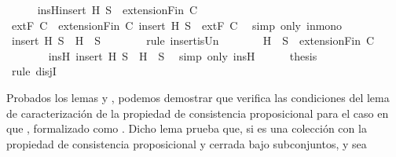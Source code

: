 \begin{isabellebody}
\ \ \ \ \isamarkupfalse%
\ insH{\isacharcolon}{\isachardoublequoteopen}insert\ H\ S\ {\isasymin}\ {\isacharparenleft}extensionFin\ C{\isacharparenright}{\isachardoublequoteclose}\isanewline
\ \ \ \ \ \ \isamarkupfalse%
\ {\isacartoucheopen}{\isacharparenleft}extF\ C{\isacharparenright}\ {\isasymsubseteq}\ {\isacharparenleft}extensionFin\ C{\isacharparenright}{\isacartoucheclose}\ {\isacartoucheopen}insert\ H\ S\ {\isasymin}\ {\isacharparenleft}extF\ C{\isacharparenright}{\isacartoucheclose}\ \isamarkupfalse%
\ {\isacharparenleft}simp\ only{\isacharcolon}\ in{\isacharunderscore}mono{\isacharparenright}\isanewline
\ \ \ \ \isamarkupfalse%
\ {\isachardoublequoteopen}insert\ H\ S\ {\isacharequal}\ {\isacharbraceleft}H{\isacharbraceright}\ {\isasymunion}\ S{\isachardoublequoteclose}\isanewline
\ \ \ \ \ \ \isamarkupfalse%
\ {\isacharparenleft}rule\ insert{\isacharunderscore}is{\isacharunderscore}Un{\isacharparenright}\isanewline
\ \ \ \ \isamarkupfalse%
\ \isamarkupfalse%
\ {\isachardoublequoteopen}{\isacharbraceleft}H{\isacharbraceright}\ {\isasymunion}\ S\ {\isasymin}\ {\isacharparenleft}extensionFin\ C{\isacharparenright}{\isachardoublequoteclose}\isanewline
\ \ \ \ \ \ \isamarkupfalse%
\ insH\ {\isacartoucheopen}insert\ H\ S\ {\isacharequal}\ {\isacharbraceleft}H{\isacharbraceright}\ {\isasymunion}\ S{\isacartoucheclose}\ \isamarkupfalse%
\ {\isacharparenleft}simp\ only{\isacharcolon}\ insH{\isacharparenright}\isanewline
\ \ \ \ \isamarkupfalse%
\ {\isacharquery}thesis\isanewline
\ \ \ \ \ \ \isamarkupfalse%
\ {\isacharparenleft}rule\ disjI{}{\isacharparenright}\isanewline
\ \ \isamarkupfalse%
\isanewline
{}\isamarkupfalse%
%
\endisatagproof
{\isafoldproof}%
%
\isadelimproof
%
\endisadelimproof
%
\begin{isamarkuptext}%
Probados los lemas  y , podemos demostrar que  
  verifica las condiciones del lema de caracterización de la propiedad de consistencia proposicional 
  para el caso en que , formalizado como . Dicho lema prueba que, si  es 
  una colección con la propiedad de consistencia proposicional y cerrada bajo subconjuntos, y sea 

\end{isamarkuptext}
\end{isabellebody}
